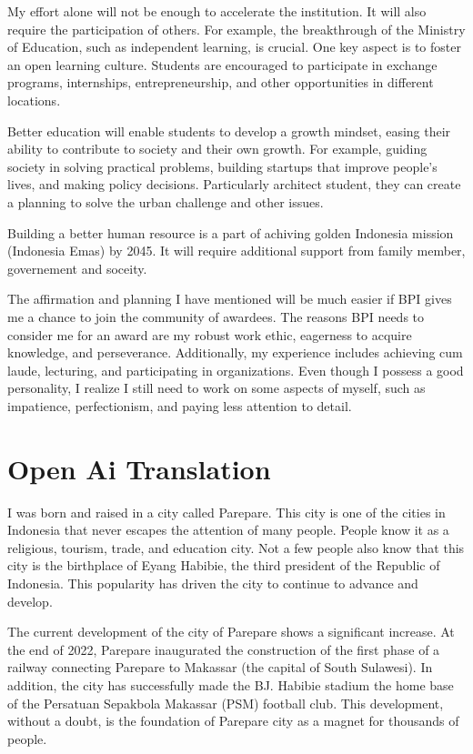 \documentclass[../main.tex]{subfiles}
\begin{document}
My effort alone will not be enough to accelerate the institution. It will also require the participation of others. For example, the breakthrough of the Ministry of Education, such as independent learning, is crucial. One key aspect is to foster an open learning culture. Students are encouraged to participate in exchange programs, internships, entrepreneurship, and other opportunities in different locations.

Better education will enable students to develop a growth mindset, easing their ability to contribute to society and their own growth. For example, guiding society in solving practical problems, building startups that improve people's lives, and making policy decisions. Particularly architect student, they can create a planning to solve the urban challenge and other issues.

Building a better human resource is a part of achiving golden Indonesia mission (Indonesia Emas) by 2045. It will require additional support from family member, governement and soceity.








The affirmation and planning I have mentioned will be much easier if BPI gives me a chance to join the community of awardees. The reasons BPI needs to consider me for an award are my robust work ethic, eagerness to acquire knowledge, and perseverance. Additionally, my experience includes achieving cum laude, lecturing, and participating in organizations. Even though I possess a good personality, I realize I still need to work on some aspects of myself, such as impatience, perfectionism, and paying less attention to detail.

\section{Open Ai Translation}%
\label{sec:Open Ai Translation}

I was born and raised in a city called Parepare.
This city is one of the cities in Indonesia that never escapes the attention of many people.
People know it as a religious, tourism, trade, and education city. Not a few people also know that this city is the birthplace of Eyang Habibie, the third president of the Republic of Indonesia. This popularity has driven the city to continue to advance and develop.

The current development of the city of Parepare shows a significant increase. At the end of 2022, Parepare inaugurated the construction of the first phase of a railway connecting Parepare to Makassar (the capital of South Sulawesi). In addition, the city has successfully made the BJ. Habibie stadium the home base of the Persatuan Sepakbola Makassar (PSM) football club. This development, without a doubt, is the foundation of Parepare city as a magnet for thousands of people.
\end{document}

